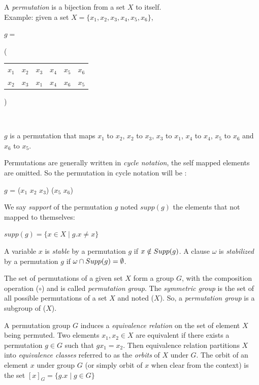 A \emph{permutation} is a bijection from a set $X$ to itself.\\
Example: given a set $X = \{x_1, x_2, x_3, x_4, x_5, x_6\}$,
\begin{center}
$g = ${\Bigg( \begin{tabular}{cccccc}
		$x_1$ & $x_2$ & $x_3$ & $x_4$ & $x_5$ & $x_6$\\
		$x_2$ & $x_3$ & $x_1$ & $x_4$ & $x_6$ & $x_5$
	\end{tabular} \Bigg)}\\
\end{center}

$g$ is a permutation that maps $x_1$ to $x_2$, $x_2$ to $x_3$, $x_3$ to $x_1$, $x_4$ to $x_4$, $x_5$ to $x_6$ and $x_6$ to $x_5$.

Permutations are generally written in \emph{cycle notation}, the self mapped elements are omitted.
So the permutation in cycle notation will be : 
\begin{center}
	$g$ = ($x_1$ $x_2$ $x_3$) ($x_5$ $x_6$)
\end{center}

We say \emph{support} of the permutation $g$ noted $supp(g)$ the elements that not mapped to themselves:
\begin{center}
	$supp(g) = \{ x \in X \mid g.x \neq x\}$
\end{center}
A variable $x$ is \emph{stable} by a permutation $g$ 
if $x \notin Supp(g)$. A clause $\omega$ is \emph{stabilized} by a permutation $g$ if 
$\omega \cap Supp(g) = \emptyset$.


The set of permutations of a given set $X$ form a group $G$,
with the composition operation ($\circ$) and is called \emph{permutation group}.
The \emph{symmetric group} is the set of all possible permutations of a set $X$ and noted \Group($X$).
So, a \emph{permutation group} is a subgroup of \Group($X$). 


A permutation group $G$ induces a \emph{equivalence relation} on the set of element $X$ being
permuted. Two elements $x_1, x_2 \in X$ are equivalent if there exists a permutation $g \in G$ such that
$g x_1 = x_2$. Then equivalence relation partitions $X$ into \emph{equivalence classes} referred to
as the \emph{orbits} of $X$ under $G$. The orbit of an element $x$ under group $G$ (or simply orbit of $x$ when clear
from the context) is the set $[x]_G = \{g.x \mid g \in G\}$


